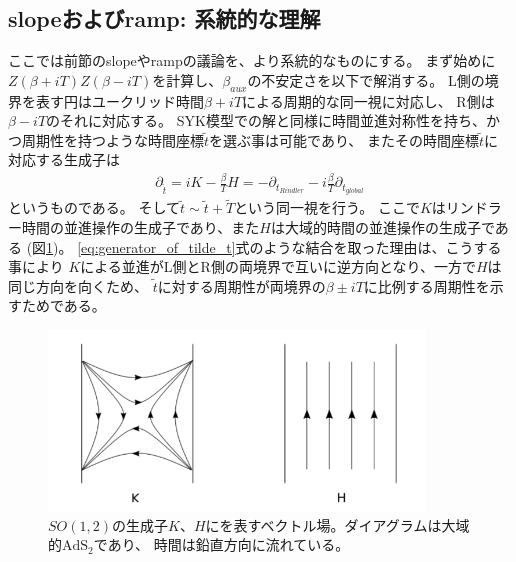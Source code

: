 \subsection{slopeおよびramp: 系統的な理解}
ここでは前節のslopeやrampの議論を、より系統的なものにする。
まず始めに$Z(\beta + iT)Z(\beta - iT)$を計算し、$\beta_{aux}$の不安定さを以下で解消する。
L側の境界を表す円はユークリッド時間$\beta + iT$による周期的な同一視に対応し、
R側は$\beta - iT$のそれに対応する。
SYK模型での解と同様に時間並進対称性を持ち、かつ周期性を持つような時間座標$\tilde{t}$を選ぶ事は可能であり、
またその時間座標$\tilde{t}$に対応する生成子は
\begin{align}
	\partial_{\tilde{t}}
	= iK - \frac{\beta}{T}H
	= -\partial_{t_{Rindler}} - i\frac{\beta}{T}\partial_{t_{global}}
	\label{eq:generator_of_tilde_t}
\end{align}
というものである。
そして$\tilde{t}\sim\tilde{t} + \tilde{T}$という同一視を行う。
ここで$K$はリンドラー時間の並進操作の生成子であり、また$H$は大域的時間の並進操作の生成子である
(図\ref{fig:time_translation})。
\eqref{eq:generator_of_tilde_t}式のような結合を取った理由は、こうする事により
$K$による並進がL側とR側の両境界で互いに逆方向となり、一方で$H$は同じ方向を向くため、
$\tilde{t}$に対する周期性が両境界の$\beta \pm iT$に比例する周期性を示すためである。

\begin{figure}[ht]
	\centering
	\includegraphics[width=10cm]{figures/time_translation}
	\caption{$SO(1,2)$の生成子$K$、$H$にを表すベクトル場。ダイアグラムは大域的$\mathrm{AdS}_2$であり、
		時間は鉛直方向に流れている。
	}
	\label{fig:time_translation}
\end{figure}

